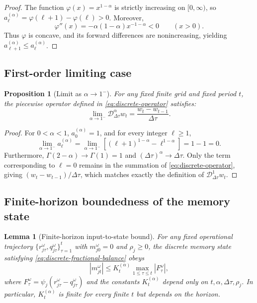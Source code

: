 \documentclass[11pt,a4paper]{article}
\newtheorem{proposition}{Proposition}
\newtheorem{lemma}{Lemma}
\begin{document}
\begin{proof}
The function \(\varphi(x)=x^{1-\alpha}\) is strictly increasing on
\([0,\infty)\), so
\(a_\ell^{(\alpha)}=\varphi(\ell+1)-\varphi(\ell)>0\). Moreover,
\[
  \varphi''(x)
  =
  -\alpha(1-\alpha)x^{-1-\alpha}<0
  \qquad (x>0).
\]
Thus \(\varphi\) is concave, and its forward differences are
nonincreasing, yielding
\(a_{\ell+1}^{(\alpha)}\leq a_\ell^{(\alpha)}\).
\end{proof}

\subsection{First-order limiting case}

\begin{proposition}[Limit as \(\alpha\to1^{-}\)]
\label{prop:alpha-limit}
For any fixed finite grid and fixed period \(t\), the piecewise operator
defined in \cref{eq:discrete-operator} satisfies:
\begin{equation}
  \lim_{\alpha\to1^-}
  \mathcal{D}_{\Delta\tau}^{\alpha}w_t
  =
  \frac{w_t-w_{t-1}}{\Delta\tau}.
  \label{eq:alpha-limit}
\end{equation}
\end{proposition}

\begin{proof}
For \(0<\alpha<1\), \(a_0^{(\alpha)}=1\), and for every integer
\(\ell\geq1\),
\[
  \lim_{\alpha\to1^-}a_\ell^{(\alpha)}
  =
  \lim_{\alpha\to1^-}\left[(\ell+1)^{1-\alpha}-\ell^{1-\alpha}\right]
  =
  1-1=0.
\]
Furthermore, \(\Gamma(2-\alpha)\to\Gamma(1)=1\) and
\((\Delta\tau)^\alpha\to\Delta\tau\). Only the term corresponding to
\(\ell=0\) remains in the summation of \cref{eq:discrete-operator},
giving \((w_t-w_{t-1})/\Delta\tau\), which matches exactly the
definition of \(\mathcal{D}_{\Delta\tau}^{1}w_t\).
\end{proof}

\subsection{Finite-horizon boundedness of the memory state}

\begin{lemma}[Finite-horizon input-to-state bound]
\label{lem:memory-bound}
For any fixed operational trajectory
\(\{r_{j\tau}^{\omega},\allowbreak
q_{j\tau}^{\omega}\}_{\tau=1}^{t}\)
with \(m_{j0}^{\omega}=0\) and \(\rho_j\geq0\), the discrete memory
state satisfying \cref{eq:discrete-fractional-balance} obeys
\begin{equation}
  |m_{jt}^{\omega}|
  \leq
  K_t^{(\alpha)}
  \max_{1\leq\tau\leq t}
  |F_\tau^\omega|,
  \label{eq:memory-bound}
\end{equation}
where \(F_\tau^\omega=\psi_j(r_{j\tau}^{\omega}-q_{j\tau}^{\omega})\)
and the constants \(K_t^{(\alpha)}\) depend only on
\(t,\alpha,\Delta\tau,\rho_j\). In particular, \(K_t^{(\alpha)}\)
is finite for every finite \(t\) but depends on the horizon.
\end{lemma}
\end{document}
